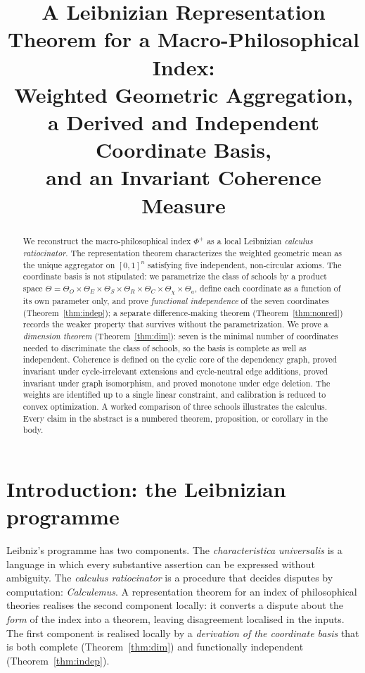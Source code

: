 \documentclass[11pt]{article}
\title{A Leibnizian Representation Theorem for a Macro-Philosophical Index:\\
Weighted Geometric Aggregation, a Derived and Independent Coordinate Basis,\\
and an Invariant Coherence Measure}
\author{}
\date{}
\theoremstyle{definition}
\theoremstyle{remark}
\newcommand{\Ph}{\Phi^{+}}
\newcommand{\Th}{\Theta}
\begin{document}
\maketitle

\begin{abstract}
We reconstruct the macro-philosophical index $\Ph$ as a local Leibnizian \emph{calculus ratiocinator}. The representation theorem characterizes the weighted geometric mean as the unique aggregator on $[0,1]^n$ satisfying five independent, non-circular axioms. The coordinate basis is not stipulated: we parametrize the class of schools by a product space $\Th=\Th_O\times\Th_E\times\Th_S\times\Th_R\times\Th_C\times\Th_\chi\times\Th_a$, define each coordinate as a function of its own parameter only, and prove \emph{functional independence} of the seven coordinates (Theorem~\ref{thm:indep}); a separate difference-making theorem (Theorem~\ref{thm:nonred}) records the weaker property that survives without the parametrization. We prove a \emph{dimension theorem} (Theorem~\ref{thm:dim}): seven is the minimal number of coordinates needed to discriminate the class of schools, so the basis is complete as well as independent. Coherence is defined on the cyclic core of the dependency graph, proved invariant under cycle-irrelevant extensions and cycle-neutral edge additions, proved invariant under graph isomorphism, and proved monotone under edge deletion. The weights are identified up to a single linear constraint, and calibration is reduced to convex optimization. A worked comparison of three schools illustrates the calculus. Every claim in the abstract is a numbered theorem, proposition, or corollary in the body.
\end{abstract}

\section{Introduction: the Leibnizian programme}\label{sec:intro}

Leibniz's programme has two components. The \emph{characteristica universalis} is a language in which every substantive assertion can be expressed without ambiguity. The \emph{calculus ratiocinator} is a procedure that decides disputes by computation: \emph{Calculemus}. A representation theorem for an index of philosophical theories realises the second component locally: it converts a dispute about the \emph{form} of the index into a theorem, leaving disagreement localised in the inputs. The first component is realised locally by a \emph{derivation of the coordinate basis} that is both complete (Theorem~\ref{thm:dim}) and functionally independent (Theorem~\ref{thm:indep}).
\end{document}
